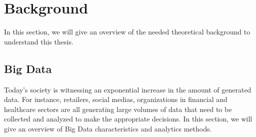 



\newcommand{\titleLineOne}{Detection of Higher-Level Concepts}
\newcommand{\titleLineTwo}{ in Highly-Linked Big Data}
\newcommand{\titleLineThree}{}
\newcommand{\documentdate}{December 22, 2015}
\newcommand{\studentname}{Max Mustermann}
\newcommand{\abstracttext}{Short version of the thesis in 250 words.}
\newcommand{\acktext}{First of all, I would like to...}

 

%


\chapter{Background}
In this section, we will give an overview of the needed theoretical background to understand this thesis.
\section{Big Data}
Today’s society is witnessing an exponential increase in the amount of generated data. For instance, retailers, social medias, organizations in financial and healthcare sectors are all generating large volumes of data that need to be collected and analyzed to make the appropriate decisions. In this section, we will give an overview of Big Data characteristics and analytics methods.
